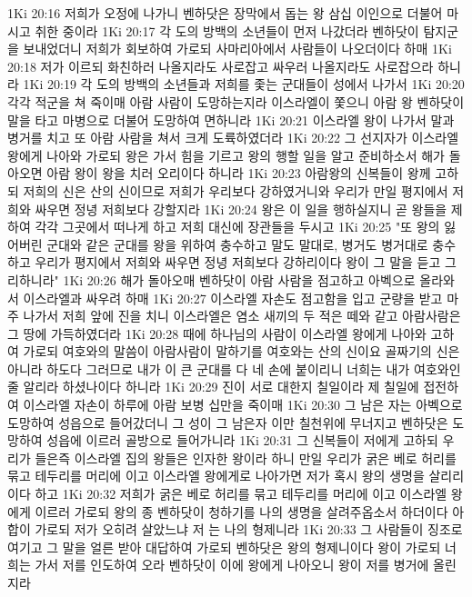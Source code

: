 1Ki 20:16  저희가 오정에 나가니 벤하닷은 장막에서 돕는 왕 삼십 이인으로 더불어 마시고 취한 중이라
1Ki 20:17  각 도의 방백의 소년들이 먼저 나갔더라 벤하닷이 탐지군을 보내었더니 저희가 회보하여 가로되 사마리아에서 사람들이 나오더이다 하매
1Ki 20:18  저가 이르되 화친하러 나올지라도 사로잡고 싸우러 나올지라도 사로잡으라 하니라
1Ki 20:19  각 도의 방백의 소년들과 저희를 좇는 군대들이 성에서 나가서
1Ki 20:20  각각 적군을 쳐 죽이매 아람 사람이 도망하는지라 이스라엘이 쫓으니 아람 왕 벤하닷이 말을 타고 마병으로 더불어 도망하여 면하니라
1Ki 20:21  이스라엘 왕이 나가서 말과 병거를 치고 또 아람 사람을 쳐서 크게 도륙하였더라
1Ki 20:22  그 선지자가 이스라엘 왕에게 나아와 가로되 왕은 가서 힘을 기르고 왕의 행할 일을 알고 준비하소서 해가 돌아오면 아람 왕이 왕을 치러 오리이다 하니라
1Ki 20:23  아람왕의 신복들이 왕께 고하되 저희의 신은 산의 신이므로 저희가 우리보다 강하였거니와 우리가 만일 평지에서 저희와 싸우면 정녕 저희보다 강할지라
1Ki 20:24  왕은 이 일을 행하실지니 곧 왕들을 제하여 각각 그곳에서 떠나게 하고 저희 대신에 장관들을 두시고
1Ki 20:25  "또 왕의 잃어버린 군대와 같은 군대를 왕을 위하여 충수하고 말도 말대로, 병거도 병거대로 충수하고 우리가 평지에서 저희와 싸우면 정녕 저희보다 강하리이다 왕이 그 말을 듣고 그리하니라"
1Ki 20:26  해가 돌아오매 벤하닷이 아람 사람을 점고하고 아벡으로 올라와서 이스라엘과 싸우려 하매
1Ki 20:27  이스라엘 자손도 점고함을 입고 군량을 받고 마주 나가서 저희 앞에 진을 치니 이스라엘은 염소 새끼의 두 적은 떼와 같고 아람사람은 그 땅에 가득하였더라
1Ki 20:28  때에 하나님의 사람이 이스라엘 왕에게 나아와 고하여 가로되 여호와의 말씀이 아람사람이 말하기를 여호와는 산의 신이요 골짜기의 신은 아니라 하도다 그러므로 내가 이 큰 군대를 다 네 손에 붙이리니 너희는 내가 여호와인줄 알리라 하셨나이다 하니라
1Ki 20:29  진이 서로 대한지 칠일이라 제 칠일에 접전하여 이스라엘 자손이 하루에 아람 보병 십만을 죽이매
1Ki 20:30  그 남은 자는 아벡으로 도망하여 성읍으로 들어갔더니 그 성이 그 남은자 이만 칠천위에 무너지고 벤하닷은 도망하여 성읍에 이르러 골방으로 들어가니라
1Ki 20:31  그 신복들이 저에게 고하되 우리가 들은즉 이스라엘 집의 왕들은 인자한 왕이라 하니 만일 우리가 굵은 베로 허리를 묶고 테두리를 머리에 이고 이스라엘 왕에게로 나아가면 저가 혹시 왕의 생명을 살리리이다 하고
1Ki 20:32  저희가 굵은 베로 허리를 묶고 테두리를 머리에 이고 이스라엘 왕에게 이르러 가로되 왕의 종 벤하닷이 청하기를 나의 생명을 살려주옵소서 하더이다 아합이 가로되 저가 오히려 살았느냐 저 는 나의 형제니라
1Ki 20:33  그 사람들이 징조로 여기고 그 말을 얼른 받아 대답하여 가로되 벤하닷은 왕의 형제니이다 왕이 가로되 너희는 가서 저를 인도하여 오라 벤하닷이 이에 왕에게 나아오니 왕이 저를 병거에 올린지라

